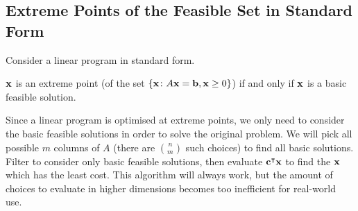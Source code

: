\subsection{Extreme Points of the Feasible Set in Standard Form}
Consider a linear program in standard form.
\begin{theorem}
    \( \vb x \) is an extreme point (of the set \( \{ \vb x \colon A \vb x = \vb b, \vb x \geq 0 \} \)) if and only if \( \vb x \) is a basic feasible solution.
\end{theorem}
\begin{remark}
    Since a linear program is optimised at extreme points, we only need to consider the basic feasible solutions in order to solve the original problem. We will pick all possible \( m \) columns of \( A \) (there are \( \binom{n}{m} \) such choices) to find all basic solutions. Filter to consider only basic feasible solutions, then evaluate \( \vb c^\intercal \vb x \) to find the \( \vb x \) which has the least cost. This algorithm will always work, but the amount of choices to evaluate in higher dimensions becomes too inefficient for real-world use.
\end{remark}
